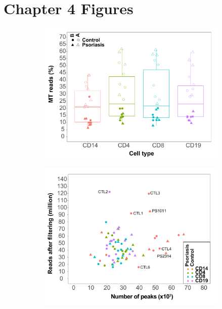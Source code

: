 \clearpage


\section{Chapter 4 Figures}

\begin{figure}[htbp]
\centering
\begin{subfigure}{0.45\textwidth}
\centering
\includegraphics[width=\textwidth]{./Appendix/pdfs/Chapter4/ATAC_PS_CTL_MT_percent_boxplot}
\caption{\textbf{}}
\end{subfigure}
\begin{subfigure}{0.45\textwidth}
\centering
\includegraphics[width=\textwidth]{./Appendix/pdfs/Chapter4/ATAC_PS_CTL_reads_vs_peaks_dotplot}

\end{subfigure}
\end{figure}
